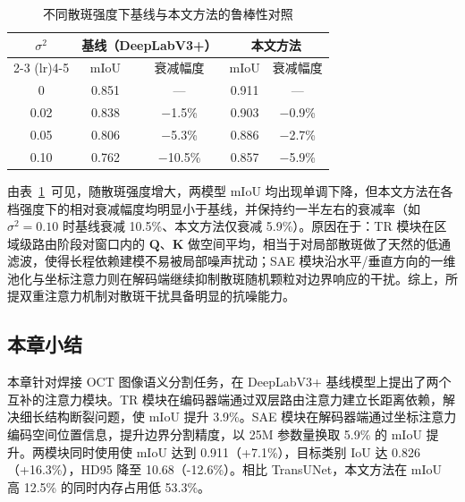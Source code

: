 \begin{table}[htbp]
\centering
\renewcommand\arraystretch{1.4}
\caption{不同散斑强度下基线与本文方法的鲁棒性对照}
\label{tab:robust_speckle}
\begin{tabular}{ccccc}
\toprule
\multirow{2}{*}{$\sigma^2$} & \multicolumn{2}{c}{基线（DeepLabV3+）} & \multicolumn{2}{c}{本文方法} \\
\cmidrule(lr){2-3} \cmidrule(lr){4-5}
 & mIoU & 衰减幅度 & mIoU & 衰减幅度 \\
\midrule
0     & 0.851 & ---     & 0.911 & ---     \\
0.02  & 0.838 & $-$1.5\% & 0.903 & $-$0.9\% \\
0.05  & 0.806 & $-$5.3\% & 0.886 & $-$2.7\% \\
0.10  & 0.762 & $-$10.5\% & 0.857 & $-$5.9\% \\
\bottomrule
\end{tabular}
\end{table}

由表~\ref{tab:robust_speckle}~可见，随散斑强度增大，两模型 mIoU 均出现单调下降，但本文方法在各档强度下的相对衰减幅度均明显小于基线，并保持约一半左右的衰减率（如 $\sigma^2=0.10$ 时基线衰减 10.5\%、本文方法仅衰减 5.9\%）。原因在于：TR 模块在区域级路由阶段对窗口内的 $\mathbf{Q}$、$\mathbf{K}$ 做空间平均，相当于对局部散斑做了天然的低通滤波，使得长程依赖建模不易被局部噪声扰动；SAE 模块沿水平/垂直方向的一维池化与坐标注意力则在解码端继续抑制散斑随机颗粒对边界响应的干扰。综上，所提双重注意力机制对散斑干扰具备明显的抗噪能力。

\subsection{本章小结}

本章针对焊接 OCT 图像语义分割任务，在 DeepLabV3+ 基线模型上提出了两个互补的注意力模块。TR 模块在编码器端通过双层路由注意力建立长距离依赖，解决细长结构断裂问题，使 mIoU 提升 3.9\%。SAE 模块在解码器端通过坐标注意力编码空间位置信息，提升边界分割精度，以 25M 参数量换取 5.9\% 的 mIoU 提升。两模块同时使用使 mIoU 达到 0.911（+7.1\%），目标类别 IoU 达 0.826（+16.3\%），HD95 降至 10.68（-12.6\%）。相比 TransUNet，本文方法在 mIoU 高 12.5\% 的同时内存占用低 53.3\%。
